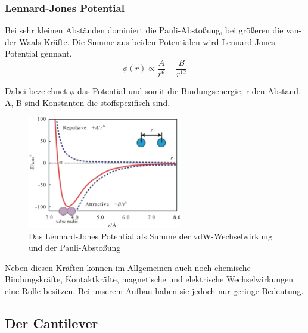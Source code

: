         \subsubsection{Lennard-Jones Potential}

Bei sehr kleinen Abständen dominiert die Pauli-Abstoßung, bei größeren die 
van-der-Waals Kräfte. Die Summe aus beiden Potentialen wird Lennard-Jones 
Potential gennant. 
\[
   \phi (r) \propto \frac{A}{r^6} - \frac{B}{r^{12}}    
\]

Dabei bezeichnet $\phi$ das Potential und somit die Bindungsenergie, r den Abstand.
A, B sind Konstanten die stoffspezifisch sind.

\begin{figure}[h!]
    \centering
    \includegraphics[width=0.6\textwidth]{Abb/ljp.jpg}
    \caption{Das Lennard-Jones Potential als Summe der vdW-Wechselwirkung und
             der Pauli-Abstoßung}
    \label{ljp}
\end{figure}

Neben diesen Kräften können im Allgemeinen auch noch chemische Bindungskräfte, Kontaktkräfte, magnetische und elektrische Wechselwirkungen eine Rolle besitzen.
Bei unserem Aufbau haben sie jedoch nur geringe Bedeutung.



\subsection{Der Cantilever}
\label{herleitung}

